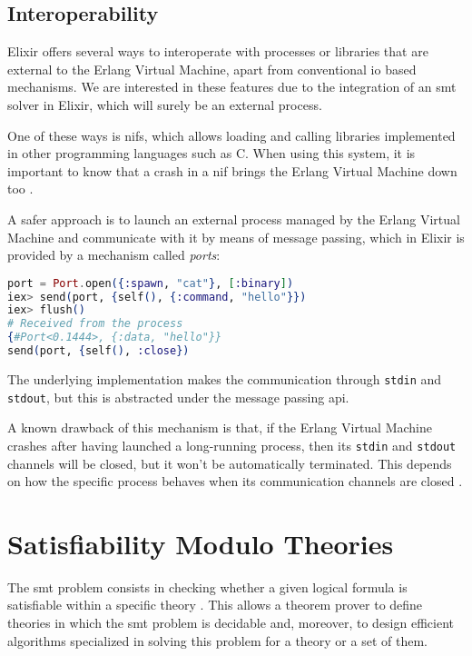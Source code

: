 \subsection{Interoperability}

Elixir offers several ways to interoperate with processes or libraries that are
external to the Erlang Virtual Machine, apart from conventional \gls{io} based
mechanisms. We are interested in these features due to the integration of an
\acrshort{smt} solver in Elixir, which will surely be an external process.

One of these ways is \gls{nif}s, which allows loading and calling libraries
implemented in other programming languages such as C. When using this system, it
is important to know that a crash in a \gls{nif} brings the Erlang Virtual 
Machine down too \citep{ErlangDocs}.

A safer approach is to launch an external process managed by the Erlang Virtual
Machine and communicate with it by means of message passing, which in Elixir is
provided by a mechanism called \textit{ports}:

\begin{lstlisting}[language=elixir,numbers=none,frame=none]
port = Port.open({:spawn, "cat"}, [:binary])
iex> send(port, {self(), {:command, "hello"}})
iex> flush()
# Received from the process
{#Port<0.1444>, {:data, "hello"}} 
send(port, {self(), :close})
\end{lstlisting}

The underlying implementation makes the communication through \verb|stdin| and 
\verb|stdout|, but this is abstracted under the message passing \gls{api}.

A known drawback of this mechanism is that, if the Erlang Virtual Machine
crashes after having launched a long-running process, then its \verb|stdin| and
\verb|stdout| channels will be closed, but it won't be automatically terminated.
This depends on how the specific process behaves when its communication channels
are closed \citep{ElixirDocs}.

\section{Satisfiability Modulo Theories}

The \gls{smt} problem consists in checking whether a given logical formula is
satisfiable within a specific theory \citep{smtLibStandard}. This allows a 
theorem prover to define theories in which the \gls{smt} problem is decidable
and, moreover, to design efficient algorithms specialized in solving this
problem for a theory or a set of them.

